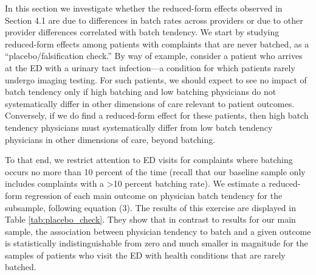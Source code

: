 \documentclass[,,nonblindrev]{informs}
\begin{document}
In this section we investigate whether the reduced-form effects observed
in Section 4.1 are due to differences in batch rates across providers or
due to other provider differences correlated with batch tendency. We
start by studying reduced-form effects among patients with complaints
that are never batched, as a ``placebo/falsification check.'' By way of
example, consider a patient who arrives at the ED with a urinary tact
infection---a condition for which patients rarely undergo imaging
testing. For such patients, we should expect to see no impact of batch
tendency only if high batching and low batching physicians do not
systematically differ in other dimensions of care relevant to patient
outcomes. Conversely, if we do find a reduced-form effect for these
patients, then high batch tendency physicians must systematically differ
from low batch tendency physicians in other dimensions of care, beyond
batching.

To that end, we restrict attention to ED visits for complaints where
batching occurs no more than 10 percent of the time (recall that our
baseline sample only includes complaints with a \textgreater10 percent
batching rate). We estimate a reduced-form regression of each main
outcome on physician batch tendency for the subsample, following
equation (3). The results of this exercise are displayed in Table
\ref{tab:placebo_check}. They show that in contrast to results for our
main sample, the association between physician tendency to batch and a
given outcome is statistically indistinguishable from zero and much
smaller in magnitude for the samples of patients who visit the ED with
health conditions that are rarely batched.
\end{document}
